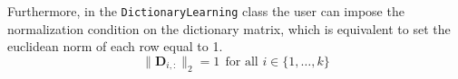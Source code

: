 Furthermore, in the \texttt{DictionaryLearning} class the user can impose the
normalization condition on the dictionary matrix, which is equivalent to set the euclidean norm of each row equal to 1.
\begin{equation}\label{dictionary normalisation}
\|\mathbf{D}_{i,:}\|_2 = 1\ \ \text{for all }i \in \{1, \dots, k\}
\end{equation}



%
%
%
%
